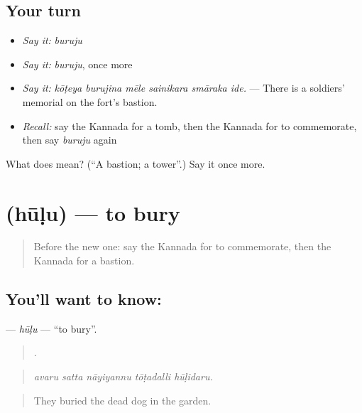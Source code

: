 \subsection*{Your turn}
\begin{itemize}
\raggedright
  \item \emph{Say it:} \emph{buruju}
  \item \emph{Say it:} \emph{buruju}, once more
  \item \emph{Say it:} \emph{kōṭeya burujina mēle sainikara smāraka ide.} — There is a soldiers' memorial on the fort's bastion.
  \item \emph{Recall:} say the Kannada for a tomb, then the Kannada for to commemorate, then say \emph{buruju} again
\end{itemize}

\begin{tcolorbox}[breakable,colback=teal!4,colframe=teal!35!black,title={Before you move on}]
What does  mean? (\textquotedblleft{}A bastion; a tower\textquotedblright{}.) Say it once more.
\end{tcolorbox}
\section[\texorpdfstring{\kn{ಹೂಳು} (hūḷu)}{ಹೂಳು (hūḷu)}]{ (hūḷu) — to bury}

\label{lesson:KA-C361-hulu}



\begin{quote}
Before the new one: say the Kannada for to commemorate, then the Kannada for a bastion.
\end{quote}

\subsection*{You'll want to know: }
\textbf{} — \emph{hūḷu} — \textquotedblleft{}to bury\textquotedblright{}.

\begin{quote}
    .
\end{quote}

\begin{quote}
\emph{avaru satta nāyiyannu tōṭadalli hūḷidaru.}
\end{quote}

\begin{quote}
They buried the dead dog in the garden.
\end{quote}

